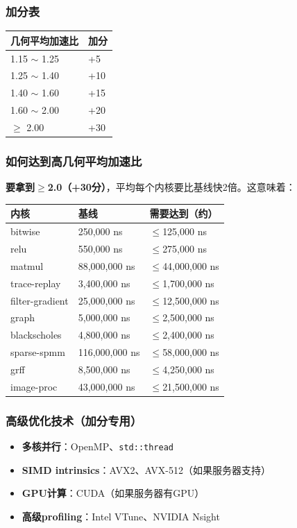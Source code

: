 \documentclass[11pt, a4paper]{article}
\begin{document}
\begin{aibox}
\subsubsection*{加分表}
\vspace{0.5em}
\begin{tabularx}{0.5\textwidth}{@{} X l @{}}
\toprule
几何平均加速比 & 加分 \\
\midrule
1.15 $\sim$ 1.25 & +5 \\
1.25 $\sim$ 1.40 & +10 \\
1.40 $\sim$ 1.60 & +15 \\
1.60 $\sim$ 2.00 & +20 \\
$\ge$ 2.00 & +30 \\
\bottomrule
\end{tabularx}
\vspace{0.5em}

\subsubsection*{如何达到高几何平均加速比}

\textbf{要拿到$\ge$2.0（+30分）}，平均每个内核要比基线快2倍。这意味着：

\vspace{0.5em}
\begin{tabularx}{\textwidth}{@{} l l X @{}}
\toprule
内核 & 基线 & 需要达到（约） \\
\midrule
bitwise & 250,000 ns & $\le$125,000 ns \\
relu & 550,000 ns & $\le$275,000 ns \\
matmul & 88,000,000 ns & $\le$44,000,000 ns \\
trace-replay & 3,400,000 ns & $\le$1,700,000 ns \\
filter-gradient & 25,000,000 ns & $\le$12,500,000 ns \\
graph & 5,000,000 ns & $\le$2,500,000 ns \\
blackscholes & 4,800,000 ns & $\le$2,400,000 ns \\
sparse-spmm & 116,000,000 ns & $\le$58,000,000 ns \\
grff & 8,500,000 ns & $\le$4,250,000 ns \\
image-proc & 43,000,000 ns & $\le$21,500,000 ns \\
\bottomrule
\end{tabularx}
\vspace{0.5em}

\subsubsection*{高级优化技术（加分专用）}
\begin{itemize}
    \item \textbf{多核并行}：OpenMP、\texttt{std::thread}
    \item \textbf{SIMD intrinsics}：AVX2、AVX-512（如果服务器支持）
    \item \textbf{GPU计算}：CUDA（如果服务器有GPU）
    \item \textbf{高级profiling}：Intel VTune、NVIDIA Nsight
\end{itemize}


\end{aibox}
\end{document}
